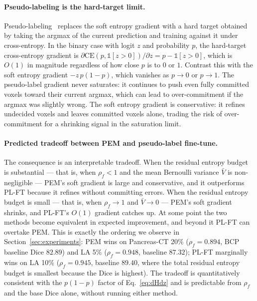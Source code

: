 \paragraph{Pseudo-labeling is the hard-target limit.}
Pseudo-labeling~\cite{lee2013pseudolabel} replaces the soft entropy gradient with a hard target obtained by taking the argmax of the current prediction and training against it under cross-entropy. In the binary case with logit $z$ and probability $p$, the hard-target cross-entropy gradient is $\partial \mathrm{CE}(p, \mathbb{1}[z\!>\!0])/\partial z \!=\! p - \mathbb{1}[z\!>\!0]$, which is $O(1)$ in magnitude regardless of how close $p$ is to $0$ or $1$. Contrast this with the soft entropy gradient $-z\,p(1{-}p)$, which vanishes as $p\!\to\!0$ or $p\!\to\!1$. The pseudo-label gradient never saturates: it continues to push even fully committed voxels toward their current argmax, which can lead to over-commitment if the argmax was slightly wrong. The soft entropy gradient is conservative: it refines undecided voxels and leaves committed voxels alone, trading the risk of over-commitment for a shrinking signal in the saturation limit.

\paragraph{Predicted tradeoff between PEM and pseudo-label fine-tune.}
The consequence is an interpretable tradeoff. When the residual entropy budget is substantial --- that is, when $\rho_f\!<\!1$ and the mean Bernoulli variance $\bar V$ is non-negligible --- PEM's soft gradient is large and conservative, and it outperforms PL-FT because it refines without committing errors. When the residual entropy budget is small --- that is, when $\rho_f\!\to\!1$ and $\bar V\!\to\!0$ --- PEM's soft gradient shrinks, and PL-FT's $O(1)$ gradient catches up. At some point the two methods become equivalent in expected improvement, and beyond it PL-FT can overtake PEM. This is exactly the ordering we observe in Section~\ref{sec:experiments}: PEM wins on Pancreas-CT 20\% ($\rho_f\!=\!0.894$, BCP baseline Dice $82.89$) and LA 5\% ($\rho_f\!=\!0.948$, baseline $87.32$); PL-FT marginally wins on LA 10\% ($\rho_f\!=\!0.945$, baseline $89.40$, where the total residual entropy budget is smallest because the Dice is highest). The tradeoff is quantitatively consistent with the $p(1{-}p)$ factor of Eq.~\ref{eq:dHdz} and is predictable from $\rho_f$ and the base Dice alone, without running either method.

